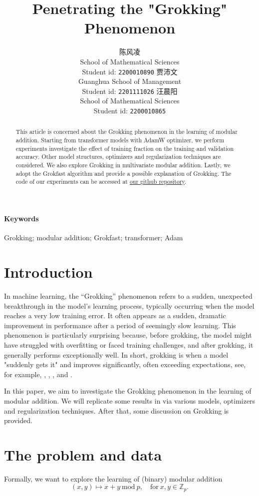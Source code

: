 \documentclass[UTF8]{article}
\title{Penetrating the "Grokking" Phenomenon}
\author{
  陈风凌 \\
  School of Mathematical Sciences\\
  Student id: \texttt{2200010890}
  \And
  贾沛文 \\
  Guanghua School of Management \\
  Student id: \texttt{2201111026}
  \AND
  汪晨阳 \\
  School of Mathematical Sciences\\
  Student id: \texttt{2200010865}
}
\begin{document}
\maketitle


\begin{abstract}
  This article is concerned about the Grokking phenomenon in the learning of modular addition. Starting from transformer models with AdamW optimizer, we perform experiments investigate the effect of training fraction on the training and validation accuracy. Other model structures, optimizers and regularization techniques are considered. We also explore Grokking in multivariate modular addition. Lastly, we adopt the Grokfast algorithm and provide a possible explanation of Grokking. 
  The code of our experiments can be accessed at
  \href{https://github.com/jpw2022/Introduction-to-ML}{our github repository}.
\end{abstract}

\paragraph{Keywords} Grokking; modular addition; Grokfast; transformer; Adam

\section{Introduction}
In machine learning, the ``Grokking'' phenomenon refers to a sudden, unexpected breakthrough in the model's learning process, typically occurring when the model reaches a very low training error. It often appears as a sudden, dramatic improvement in performance after a period of seemingly slow learning. This phenomenon is particularly surprising because, before grokking, the model might have struggled with overfitting or faced training challenges, and after grokking, it generally performs exceptionally well. In short, grokking is when a model "suddenly gets it" and improves significantly, often exceeding expectations, see, for example, \cite{power2022grokking}, \cite{lee2024grokfast}, \cite{mohamadi2024you}, \cite{kumar2023grokking} and 
\cite{lyu2023dichotomy}. 

In this paper, we aim to investigate the Grokking phenomenon in the learning of modular addition. We will replicate some results in \cite{power2022grokking} via various models, optimizers and regularization techniques. After that, some discussion on Grokking is provided. 
 

\section{The problem and data}
Formally, we want to explore the learning of (binary) modular addition
\begin{equation*}
(x,y) \mapsto x+y~ \mathrm{mod} ~ p, \quad \text{for}~ x,y \in \mathbb{Z}_p.
\end{equation*}  
\end{document}

